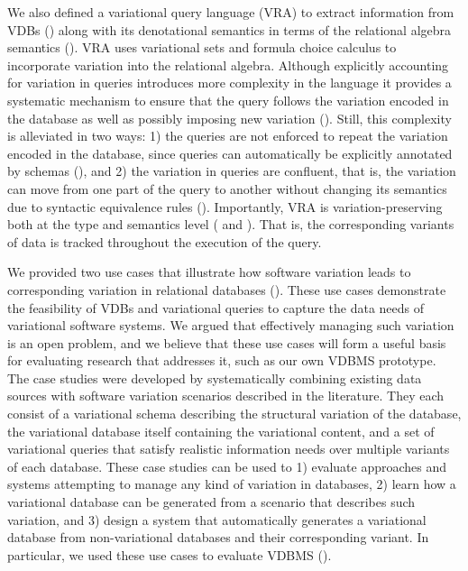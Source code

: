 We also defined a variational query language (VRA) to extract information from VDBs
() along with its denotational semantics in terms of the relational algebra 
semantics (). 
%
VRA uses variational sets and formula choice calculus to incorporate
variation into the relational algebra. Although explicitly accounting for variation
in queries introduces more complexity in the language it provides a systematic
mechanism to ensure that the query follows the variation encoded in the database
as well as possibly imposing new variation (). Still, this complexity
is alleviated in two ways: 1) the queries are not enforced to repeat the variation encoded in the 
database, since queries can automatically be explicitly annotated by schemas (),
and 2) the variation in queries are confluent, that is, the variation can move from one 
part of the query to another without changing its semantics due to syntactic equivalence
rules (). 
%
Importantly, VRA is variation-preserving both at the type and semantics level
( and ). 
That is, the corresponding variants of data is tracked throughout the execution of
the query.

We provided two use cases that illustrate how software variation leads to
corresponding variation in relational databases (). 
These use cases demonstrate
the feasibility of VDBs and variational queries to capture the data needs of variational
software systems.
%
We argued that effectively managing such variation is an open problem, and we
believe that these use cases will form a useful basis for evaluating
research that addresses it, such as our own VDBMS prototype.
%
The case studies were developed by systematically combining existing data
sources with software variation scenarios described in the literature. They
each consist of a variational schema describing the structural variation of
the database, the variational database itself containing the variational
content, and a set of variational queries that satisfy realistic information
needs over multiple variants of each database.
% 
These case studies can be used to 1) evaluate approaches and systems
 attempting to manage any kind of variation in databases, 2) learn how a
 variational database can be generated from a scenario that describes such
 variation, and 3) design a system that automatically generates a variational
 database from non-variational databases and their corresponding variant. In
 particular, we used these use cases to evaluate VDBMS (). 


